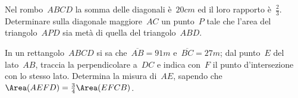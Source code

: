 \begin{multicols}{2}
\begin{esercizio}[\Ast]
\label{ese:16.132}
Nel rombo~$ABCD$ la somma delle diagonali è~$20\unit{cm}$ ed il loro rapporto è~$\frac{2}{3}$. Determinare sulla diagonale maggiore~$AC$ un punto~$P$ tale che l'area del triangolo~$APD$ sia metà di quella del triangolo~$ABD$.
\end{esercizio}

\begin{esercizio}
\label{ese:16.133}
In un rettangolo~$ABCD$ si sa che~$\overline{AB}=91\unit{m}$ e~$\overline{BC}=27\unit{m}$; dal punto~$E$ del lato~$AB$, traccia la perpendicolare a~$DC$ e indica con~$F$ il punto d'intersezione con lo stesso lato. Determina la misura di~$AE$, sapendo che~$\Area(AEFD)=\frac{3}{4}\Area(EFCB)$.
\end{esercizio}
\end{multicols}
\pagebreak
